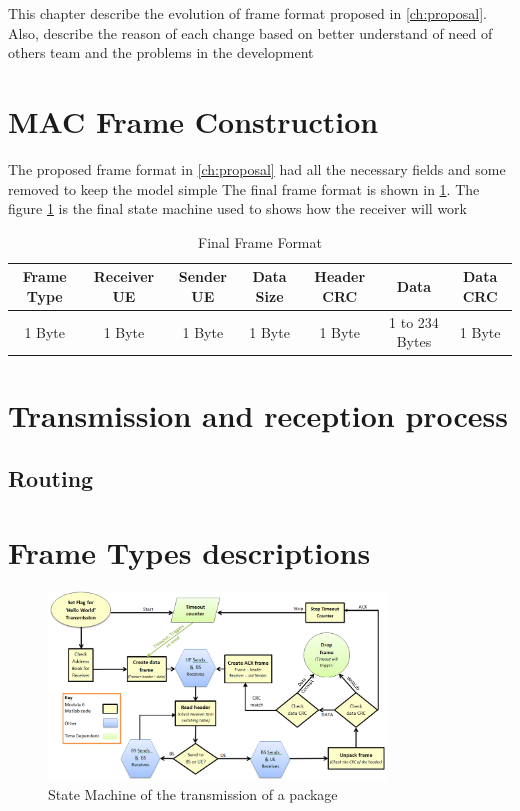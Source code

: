 This chapter describe the evolution of frame format proposed in \ref{ch:proposal}. Also, describe the reason
 of each change based on better understand of need of others team and the problems in the development


\section{MAC Frame Construction}
The proposed frame format in \ref{ch:proposal} had all the necessary fields and some removed to keep the model simple
The final frame format is  shown in \ref{tab:finalFrame}.
The figure \ref{fig:stateMachine} is the final state machine used to shows how the receiver will work

\begin{table}
\begin{tabular}{| c | c | c | c | c | c | c | }
  \hline                       
  Frame Type & Receiver UE & Sender UE & Data Size & Header CRC & Data & Data CRC\\
  \hline
	1 Byte & 1 Byte & 1 Byte & 1 Byte & 1 Byte & 1 to 234 Bytes & 1 Byte\\
  
  \hline  
\end{tabular}
 \caption{Final Frame Format}
	\label{tab:finalFrame}
\end{table}

\section{Transmission and reception process}
\subsection {Routing}

\section{Frame Types descriptions}


\begin{figure}[p]
    \centering
    \includegraphics[width=0.8\textwidth]{State_Machine_yellow.PNG}
    \caption{State Machine of the transmission of a package }
    \label{fig:stateMachine}
\end{figure}

